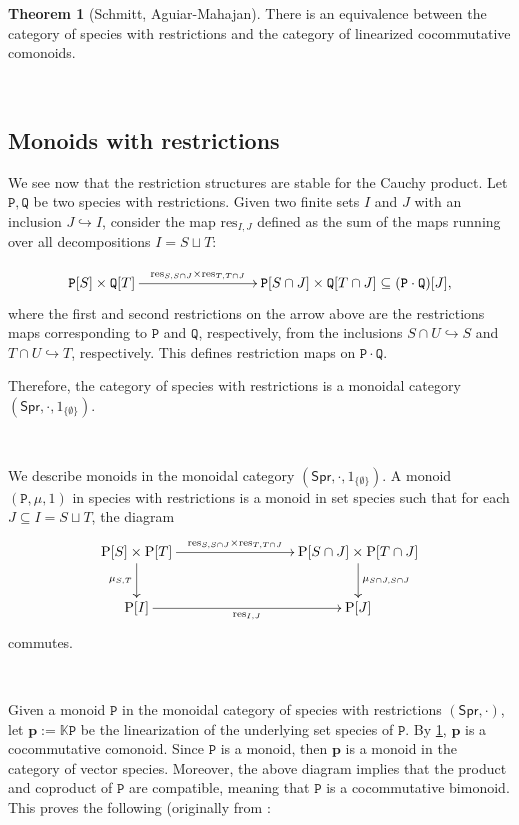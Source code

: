 \documentclass[12pt, reqno]{amsart}
\theoremstyle{definition}
\newtheorem{thm}{Theorem}[section]
\newcommand{\Spr}{\mathsf{Spr}} %
\newcommand{\rP}{\mathrm{P}}
\newcommand{\prP}{\mathtt{P}}
\newcommand{\prQ}{\mathtt{Q}}
\newcommand{\tp}{\mathbf{p}}
\begin{document}
\begin{thm}[Schmitt, Aguiar-Mahajan]\label{thm:swr_lcc}
There is an equivalence between the category of species with restrictions and the category of linearized cocommutative comonoids.
\end{thm}

\

\subsection{Monoids with restrictions}
We see now that the restriction structures are stable for the Cauchy product.
Let $\prP, \prQ$ be two species with restrictions.
Given two finite sets $I$ and $J$ with an inclusion $J \hookrightarrow I$, consider the map $\text{res}_{I,J}$ defined as the sum of the maps running over all decompositions $I=S\sqcup T$:

\[\xymatrix{
\prP[S]\times \prQ[T] \ar[rrr]^-{\text{res}_{S, S\cap J} \times \text{res}_{T, T\cap J}}&&& \prP[S\cap J]\times \prQ[T\cap J] \subseteq (\prP \cdot \prQ)[J],
}\]
where the first and second restrictions on the arrow above are the restrictions maps corresponding to $\prP$ and $\prQ$, respectively, from the inclusions $S \cap U \hookrightarrow S$ and $T \cap U \hookrightarrow T$, respectively. 
This defines restriction maps on $\prP \cdot \prQ$.
\

Therefore, the category of species with restrictions is a monoidal category $(\Spr, \cdot, \mathrm{1}_{\{\emptyset\}})$.

\

We describe monoids in the monoidal category $(\Spr, \cdot, \mathrm{1}_{\{\emptyset \} })$. 
A monoid $(\prP, \mu, 1)$ in species with restrictions is a monoid in set species such that for each $J \subseteq I=S\sqcup T$, the diagram
\[\xymatrix{
\rP[S]\times \rP[T]\ar[d]_-{\mu_{S,T}} \ar[rrr]^-{\text{res}_{S, S\cap J} \times \text{res}_{T, T\cap J}}&&&\rP[S \cap J]\times \rP[T\cap J]\ar[d]^-{\mu_{S \cap J, S\cap J}}\\
\rP[I]\ar[rrr]_-{\text{res}_{I,J}}&&& \rP[J]
}\]
commutes.

\

Given a monoid $\prP$ in the monoidal category of species with restrictions $(\Spr, \cdot)$, let $\tp:=\mathbb{K}\prP$ be the linearization of the underlying set species of $\prP$. 
By \cref{thm:swr_lcc}, $\tp$ is a cocommutative comonoid. Since $\prP$ is a monoid, then $\tp$ is a monoid in the category of vector species. Moreover, the above diagram implies that the product and coproduct of $\prP$ are compatible, meaning that $\prP$ is a cocommutative bimonoid. 
This proves the following (originally from \cite{AM2010}:
\end{document}
